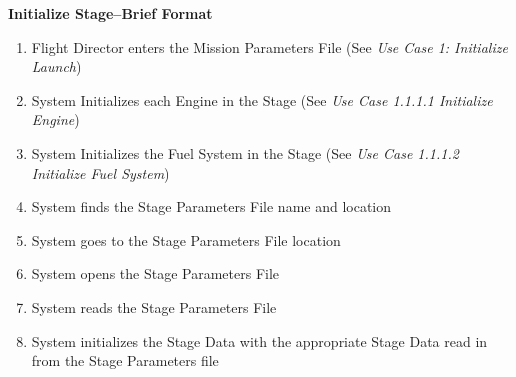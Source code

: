 \documentclass[letterpaper]{article}
\begin{document}
\noindent
\textbf{Initialize Stage--Brief Format}
\begin{enumerate}
   \item Flight Director enters the Mission Parameters File (See 
      \textit{Use Case 1:  Initialize Launch})
   \item System Initializes each Engine in the Stage (See 
      \textit{Use Case 1.1.1.1 Initialize Engine})
   \item System Initializes the Fuel System in the Stage (See
      \textit{Use Case 1.1.1.2 Initialize Fuel System})
   \item System finds the Stage Parameters File name and location
   \item System goes to the Stage Parameters File location
   \item System opens the Stage Parameters File
   \item System reads the Stage Parameters File
   \item System initializes the Stage Data with the appropriate Stage
      Data read in from the Stage Parameters file
\end{enumerate}
\end{document}
